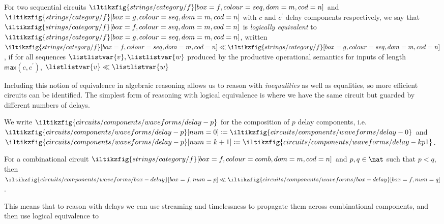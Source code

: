 \documentclass{lmcs}
\begin{document}
\begin{defi}
    For two sequential circuits \(
    \iltikzfig{strings/category/f}[box=f,colour=seq,dom=m,cod=n]
    \) and \(
    \iltikzfig{strings/category/f}[box=g,colour=seq,dom=m,cod=n]
    \) with \(c\) and \(c^\prime\) delay components respectively, we say that \(
    \iltikzfig{strings/category/f}[box=f,colour=seq,dom=m,cod=n]
    \) is \emph{logically equivalent} to \(
    \iltikzfig{strings/category/f}[box=g,colour=seq,dom=m,cod=n]
    \), written \(
    \iltikzfig{strings/category/f}[box=f,colour=seq,dom=m,cod=n]
    \ll
    \iltikzfig{strings/category/f}[box=g,colour=seq,dom=m,cod=n]
    \), if for all sequences \(\listlistvar{v},\listlistvar{w}\) produced by the
    productive operational semantics for inputs of length
    \(\mathsf{max}(c,c^\prime)\),  \(\listlistvar{v} \ll \listlistvar{w}\)
\end{defi}

Including this notion of equivalence in algebraic reasoning allows us to reason
with \emph{inequalities} as well as equalities, so more efficient circuits can
be identified.
The simplest form of reasoning with logical equivalence is where we have the
same circuit but guarded by different numbers of delays.

\begin{nota}
    We write \(
    \iltikzfig{circuits/components/waveforms/delay-p}
    \) for the composition of \(p\) delay components, i.e.\ \(
    \iltikzfig{circuits/components/waveforms/delay-p}[num=0]
    \coloneqq
    \iltikzfig{circuits/components/waveforms/delay-0}
    \) and \(
    \iltikzfig{circuits/components/waveforms/delay-p}[num=k+1]
    \coloneqq
    \iltikzfig{circuits/components/waveforms/delay-kp1}
    \).
\end{nota}

\begin{lem}
    For a combinational circuit \(
    \iltikzfig{strings/category/f}[box=f,colour=comb,dom=m,cod=n]
    \) and \(p,q \in \nat\) such that \(p < q\), then \(
    \iltikzfig{circuits/components/waveforms/box-delay}[box=f,num=p]
    \ll
    \iltikzfig{circuits/components/waveforms/box-delay}[box=f,num=q]
    \).
\end{lem}

This means that to reason with delays we can use streaming and
timelessness to propagate them across combinational components, and then use
logical equivalence to
\end{document}
